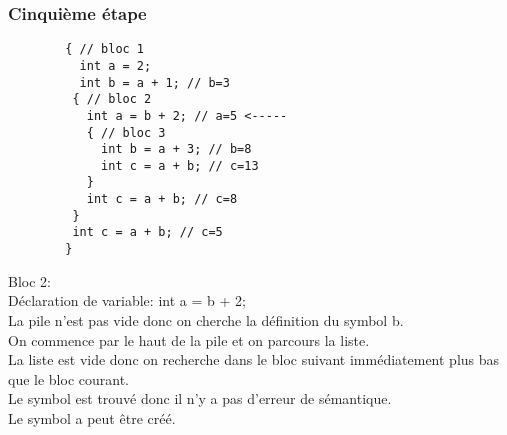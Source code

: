 \documentclass{../../res/univ-projet}
\begin{document}
    \subsubsection{Cinquième étape}
    \begin{multicols}{2}
        
        \begin{verbatim}
        { // bloc 1
          int a = 2;
          int b = a + 1; // b=3
         { // bloc 2
           int a = b + 2; // a=5 <-----
           { // bloc 3
             int b = a + 3; // b=8
             int c = a + b; // c=13
           }
           int c = a + b; // c=8
         }
         int c = a + b; // c=5
        }

        \end{verbatim}

      \columnbreak
        Bloc 2:\\
        Déclaration de variable: int a = b + 2;\\
        La pile n'est pas vide donc on cherche la définition du symbol b.\\
        On commence par le haut de la pile et on parcours la liste.\\
        La liste est vide donc on recherche dans le bloc suivant immédiatement plus bas que le bloc courant.\\
        Le symbol est trouvé donc il n'y a pas d'erreur de sémantique.\\
        Le symbol a peut être créé.
        
      \end{multicols}
\end{document}
